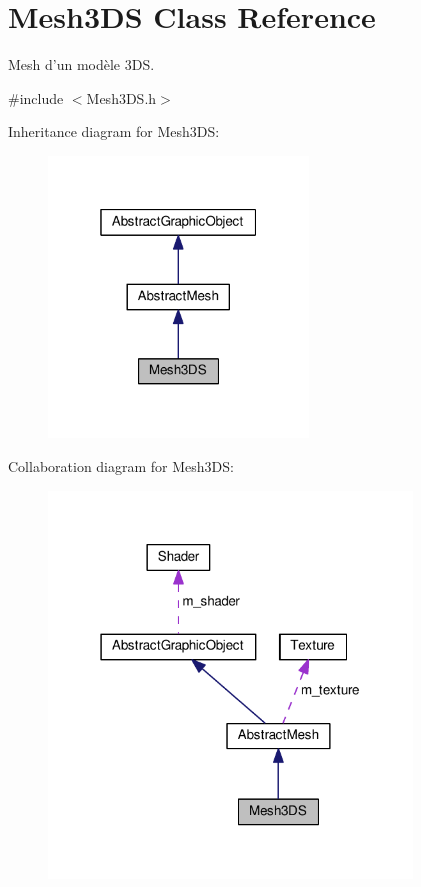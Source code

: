 \hypertarget{classMesh3DS}{\section{Mesh3\+D\+S Class Reference}
\label{classMesh3DS}
}


Mesh d'un modèle 3\+D\+S.  




{\ttfamily \#include $<$Mesh3\+D\+S.\+h$>$}



Inheritance diagram for Mesh3\+D\+S\+:\nopagebreak
\begin{figure}[H]
\begin{center}
\leavevmode
\includegraphics[width=196pt]{classMesh3DS__inherit__graph}
\end{center}
\end{figure}


Collaboration diagram for Mesh3\+D\+S\+:\nopagebreak
\begin{figure}[H]
\begin{center}
\leavevmode
\includegraphics[width=274pt]{classMesh3DS__coll__graph}
\end{center}
\end{figure}
